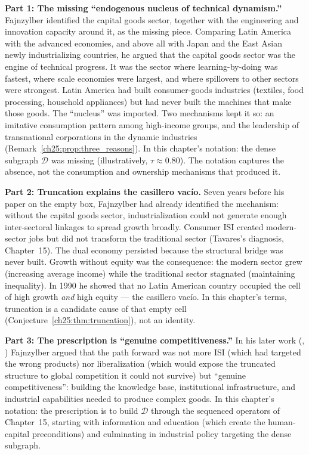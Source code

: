 \documentclass[../structural_economics_book.tex]{subfiles}
\begin{document}
\textbf{Part 1: The missing ``endogenous nucleus of technical dynamism.''} Fajnzylber identified the capital goods sector, together with the engineering and innovation capacity around it, as the missing piece. Comparing Latin America with the advanced economies, and above all with Japan and the East Asian newly industrializing countries, he argued that the capital goods sector was the engine of technical progress. It was the sector where learning-by-doing was fastest, where scale economies were largest, and where spillovers to other sectors were strongest. Latin America had built consumer-goods industries (textiles, food processing, household appliances) but had never built the machines that make those goods. The ``nucleus'' was imported. Two mechanisms kept it so: an imitative consumption pattern among high-income groups, and the leadership of transnational corporations in the dynamic industries (Remark~\ref{ch25:prop:three_reasons}). In this chapter's notation: the dense subgraph $\mathcal{D}$ was missing (illustratively, $\tau \approx 0.80$). The notation captures the absence, not the consumption and ownership mechanisms that produced it.

\textbf{Part 2: Truncation explains the casillero vac\'{i}o.} Seven years before his \citeyear{fajnzylber1990industrializacion} paper on the empty box, Fajnzylber had already identified the mechanism: without the capital goods sector, industrialization could not generate enough inter-sectoral linkages to spread growth broadly. Consumer ISI created modern-sector jobs but did not transform the traditional sector (Tavares's diagnosis, Chapter~15). The dual economy persisted because the structural bridge was never built. Growth without equity was the consequence: the modern sector grew (increasing average income) while the traditional sector stagnated (maintaining inequality). In 1990 he showed that no Latin American country occupied the cell of high growth \emph{and} high equity --- the casillero vac\'{i}o. In this chapter's terms, truncation is a candidate cause of that empty cell (Conjecture~\ref{ch25:thm:truncation}), not an identity.

\textbf{Part 3: The prescription is ``genuine competitiveness.''} In his later work (\citeyear{fajnzylber1988competitividad}, \citeyear{fajnzylber1990industrializacion}) Fajnzylber argued that the path forward was not more ISI (which had targeted the wrong products) nor liberalization (which would expose the truncated structure to global competition it could not survive) but ``genuine competitiveness'': building the knowledge base, institutional infrastructure, and industrial capabilities needed to produce complex goods. In this chapter's notation: the prescription is to build $\mathcal{D}$ through the sequenced operators of Chapter~15, starting with information and education (which create the human-capital preconditions) and culminating in industrial policy targeting the dense subgraph.
\end{document}
